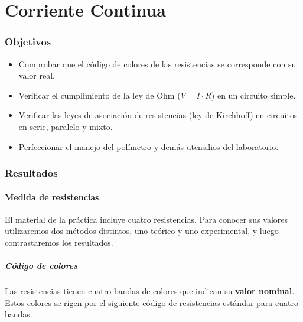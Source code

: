\documentclass[12pt, a4paper, titlepage]{article}
\begin{document}
  \newpage
  \part{Corriente Continua}

  \section{Objetivos}
  \begin{itemize}[label=$-$]
    \item Comprobar que el código de colores de las resistencias se corresponde con su valor real.
    \item Verificar el cumplimiento de la ley de Ohm ($V = I\cdot R$) en un circuito simple.
    \item Verificar las leyes de asociación de resistencias (ley de Kirchhoff) en circuitos en serie, paralelo y mixto.
    \item Perfeccionar el manejo del polímetro y demás utensilios del laboratorio.
  \end{itemize}


  \section{Resultados}


  \subsection{Medida de resistencias}
  El material de la práctica incluye cuatro resistencias. Para conocer sus valores utilizaremos dos métodos distintos, uno teórico y uno experimental, y luego contrastaremos los resultados.

  \subsubsection{Código de colores}
  Las resistencias tienen cuatro bandas de colores que indican su \textbf{valor nominal}. Estos colores se rigen por el siguiente código de resistencias estándar para cuatro bandas.
\end{document}
